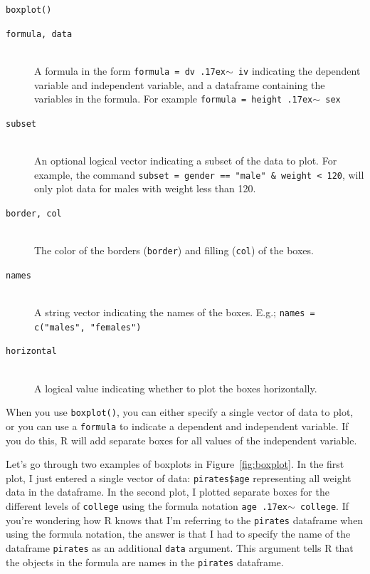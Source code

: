 \documentclass{tufte-book}\usepackage[]{graphicx}\usepackage[]{color}
\newcommand{\newfun}[1]{\begin{LARGE} \begin{center} \texttt{#1} \end{center} \end{LARGE}}
\begin{document}
\begin{footnotesize}
{{\newfun{boxplot()}

\hline

\begin{description}

  \item[\tt{formula, data}] \hfill \\
      A formula in the form \texttt{formula = dv {\raise.17ex\hbox{$\scriptstyle\sim$}} iv} indicating the dependent variable and independent variable, and a dataframe containing the variables in the formula. For example \texttt{formula = height {\raise.17ex\hbox{$\scriptstyle\sim$}} sex}
        \item[\tt{subset}] \hfill \\
  An optional logical vector indicating a subset of the data to plot. For example, the command \texttt{subset = gender == "male" \& weight < 120}, will only plot data for males with weight less than 120.
         \item[\tt{border, col}] \hfill \\
    The color of the borders (\texttt{border}) and filling (\texttt{col}) of the boxes.
        \item[\tt{names}] \hfill \\
      A string vector indicating the names of the boxes. E.g.; \texttt{names = c("males", "females")}
        \item[\tt{horizontal}] \hfill \\
   A logical value indicating whether to plot the boxes horizontally.
\end{description}

}
}
\vspace{5mm} %

When you use \texttt{boxplot()}, you can either specify a single vector of data to plot, or you can use a \texttt{formula} to indicate a dependent and independent variable. If you do this, R will add separate boxes for all values of the independent variable.

Let's go through two examples of boxplots in Figure~\ref{fig:boxplot}. In the first plot, I just entered a single vector of data: \texttt{pirates\$age} representing all weight data in the dataframe. In the second plot, I plotted separate boxes for the different levels of \texttt{college} using the formula notation \texttt{age {\raise.17ex\hbox{$\scriptstyle\sim$}} college}. If you're wondering how R knows that I'm referring to the \texttt{pirates} dataframe when using the formula notation, the answer is that I had to specify the name of the dataframe \texttt{pirates} as an additional \texttt{data} argument. This argument tells R that the objects in the formula are names in the \texttt{pirates} dataframe.




\end{footnotesize}
\end{document}
